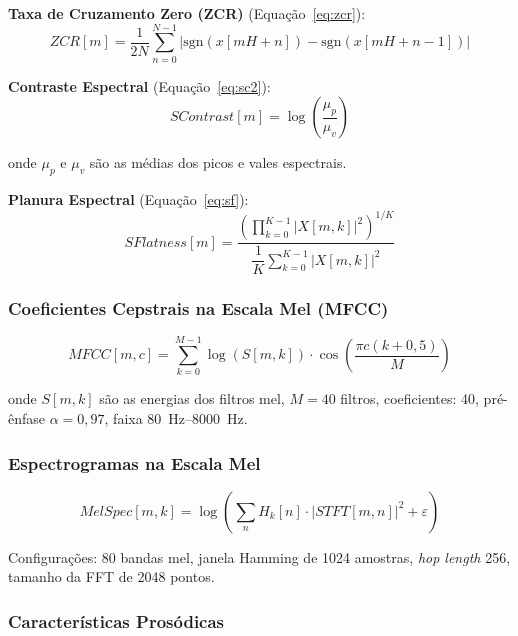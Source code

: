 \documentclass[12pt,a4paper]{article}
\begin{document}
\textbf{Taxa de Cruzamento Zero (ZCR)} (Equação~\ref{eq:zcr}):
\begin{equation}
\label{eq:zcr}
ZCR[m] = \frac{1}{2N}\sum_{n=0}^{N-1}
|\mathrm{sgn}(x[mH+n]) - \mathrm{sgn}(x[mH+n-1])|
\end{equation}

\textbf{Contraste Espectral} (Equação~\ref{eq:sc2}):
\begin{equation}
\label{eq:sc2}
SContrast[m] = \log\!\left(\frac{\mu_p}{\mu_v}\right)
\end{equation}

\noindent
onde $\mu_p$ e $\mu_v$ são as médias dos picos e vales espectrais.

\textbf{Planura Espectral} (Equação~\ref{eq:sf}):
\begin{equation}
\label{eq:sf}
SFlatness[m] =
\frac{\left(\displaystyle\prod_{k=0}^{K-1}|X[m,k]|^2\right)^{1/K}}
     {\dfrac{1}{K}\displaystyle\sum_{k=0}^{K-1}|X[m,k]|^2}
\end{equation}

\subsubsection{Coeficientes Cepstrais na Escala Mel (MFCC)}

\begin{equation}
\label{eq:mfcc}
MFCC[m,c] = \sum_{k=0}^{M-1}\log(S[m,k])\cdot
\cos\!\left(\frac{\pi c(k+0{,}5)}{M}\right)
\end{equation}

\noindent
onde $S[m,k]$ são as energias dos filtros mel, $M=40$ filtros, coeficientes:
40, pré-ênfase $\alpha=0{,}97$, faixa \SIrange{80}{8000}{\hertz}.

\subsubsection{Espectrogramas na Escala Mel}

\begin{equation}
\label{eq:melspec}
MelSpec[m,k] = \log\!\left(\sum_{n}H_k[n]\cdot|STFT[m,n]|^2 +
\varepsilon\right)
\end{equation}

Configurações: 80 bandas mel, janela Hamming de 1024 amostras,
\textit{hop length} 256, tamanho da FFT de 2048 pontos.

\subsubsection{Características Prosódicas}
\end{document}
